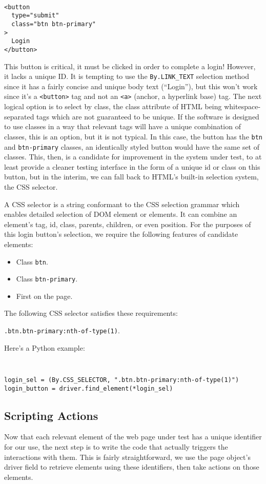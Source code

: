 {\tt
\begin{verbatim}
<button
  type="submit"
  class="btn btn-primary"
>
  Login
</button>
\end{verbatim}
}

This button is critical, it must be clicked in order to complete a login! However, it lacks a unique ID. It is tempting to use the \texttt{By.LINK\_TEXT} selection method since it has a fairly concise and unique body text (``Login''), but this won't work since it's a \texttt{<button>} tag and not an \texttt{<a>} (anchor, a hyperlink base) tag. The next logical option is to select by class, the class attribute of HTML being whitespace-separated tags which are not guaranteed to be unique. If the software is designed to use classes in a way that relevant tags will have a unique combination of classes, this is an option, but it is not typical. In this case, the button has the \texttt{btn} and \texttt{btn-primary} classes, an identically styled button would have the same set of classes. This, then, is a candidate for improvement in the system under test, to at least provide a cleaner testing interface in the form of a unique id or class on this button, but in the interim, we can fall back to HTML's built-in selection system, the CSS selector.

A CSS selector is a string conformant to the CSS selection grammar \citep{Selector54} which enables detailed selection of DOM element or elements. It can combine an element's tag, id, class, parents, children, or even position. For the purposes of this login button's selection, we require the following features of candidate elements:
\begin{itemize}
\item Class \texttt{btn}.
\item Class \texttt{btn-primary}.
\item First on the page.
\end{itemize}

The following CSS selector satisfies these requirements:

\texttt{.btn.btn-primary:nth-of-type(1)}.

Here's a Python example:
{\tt
\begin{verbatim}
login_sel = (By.CSS_SELECTOR, ".btn.btn-primary:nth-of-type(1)")
login_button = driver.find_element(*login_sel)
\end{verbatim}
}

\subsection{Scripting Actions}
Now that each relevant element of the web page under test has a unique identifier for our use, the next step is to write the code that actually triggers the interactions with them. This is fairly straightforward, we use the page object's driver field to retrieve elements using these identifiers, then take actions on those elements.

